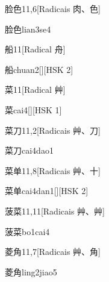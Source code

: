 \begin{entry}{脸色}{11,6}[Radicais ⾁、⾊]
  \begin{phonetics}{脸色}{lian3se4}
  \end{phonetics}
\end{entry}

\begin{entry}{船}{11}[Radical ⾈]
  \begin{phonetics}{船}{chuan2}[][HSK 2]
  \end{phonetics}
\end{entry}

\begin{entry}{菜}{11}[Radical ⾋]
  \begin{phonetics}{菜}{cai4}[][HSK 1]
  \end{phonetics}
\end{entry}

\begin{entry}{菜刀}{11,2}[Radicais ⾋、⼑]
  \begin{phonetics}{菜刀}{cai4dao1}
  \end{phonetics}
\end{entry}

\begin{entry}{菜单}{11,8}[Radicais ⾋、⼗]
  \begin{phonetics}{菜单}{cai4dan1}[][HSK 2]
  \end{phonetics}
\end{entry}

\begin{entry}{菠菜}{11,11}[Radicais ⾋、⾋]
  \begin{phonetics}{菠菜}{bo1cai4}
  \end{phonetics}
\end{entry}

\begin{entry}{菱角}{11,7}[Radicais ⾋、⾓]
  \begin{phonetics}{菱角}{ling2jiao5}
  \end{phonetics}
\end{entry}

